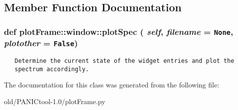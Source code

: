 \subsection{Member Function Documentation}
\subsubsection{\setlength{\rightskip}{0pt plus 5cm}def plot\-Frame::window::plot\-Spec ( {\em self},  {\em filename} = {\tt None},  {\em plotother} = {\tt False})}\label{classplotFrame_1_1window_869b6a593553ce9895e4c5ca468b4782}




\footnotesize\begin{verbatim}
   Determine the current state of the widget entries and plot the
   spectrum accordingly.
\end{verbatim}
\normalsize
 

The documentation for this class was generated from the following file:\begin{CompactItemize}
\item 
old/PANICtool-1.0/plot\-Frame.py\end{CompactItemize}
